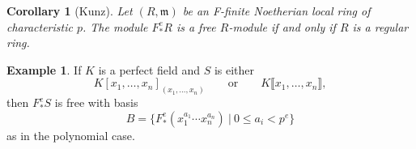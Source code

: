 \documentclass[12pt]{amsart}
\newtheorem{corollary}[theorem]{Corollary}
\theoremstyle{definition}
\newtheorem{example}[theorem]{Example}
\numberwithin{equation}{theorem}
\def\frakm{\mathfrak{m}}
\begin{document}
\begin{corollary}[Kunz]
Let $(R,\frakm)$ be an F-finite Noetherian local ring of characteristic $p$. The module $F^e_* R$ is a free $R$-module if and only if $R$ is a regular ring.
\end{corollary}

\begin{example} If $K$ is a perfect field and $S$ is either
\[ K[x_1,\dots,x_n]_{(x_1,\dots,x_n)} \qquad \text{or} \qquad  K\llbracket x_1,\dots,x_n \rrbracket,\]
then $F^e_*S$ is free with basis
\[ B= \{ F^e_*(x_1^{a_1} \cdots x_n^{a_n}) \ | \ 0\leq a_i < p^e \}\]
as in the polynomial case.
\end{example}

\begin{comment}

\newpage 

\section*{Exercise set \#1} Throughout this problem set all rings have characteristic $p$.


\end{comment}
\end{document}
